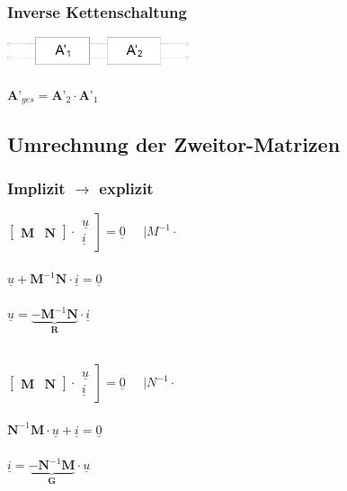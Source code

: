 \documentclass[a4paper,twocolumn,10pt]{article}
\begin{document}
\subsubsection*{Inverse Kettenschaltung}
\includegraphics[width=0.4\textwidth]{Grafiken/Zweitor_inversKette}\\\\
$\textbf{A'}_{ges}=\textbf{A'}_2\cdot \textbf{A'}_1$

\subsection*{Umrechnung der Zweitor-Matrizen}
\subsubsection*{Implizit $\rightarrow$ explizit}
\begin{minipage}[b]{0.23\textwidth}
$\begin{bmatrix}\textbf{M} & \textbf{N}\end{bmatrix}\cdot \left.\begin{matrix}\underline{u}\\\underline{i}\end{matrix}\right]=\underline{0}\;\;\;\;\;|M^{-1}\cdot$\\\\
$\underline{u}+\textbf{M}^{-1}\textbf{N}\cdot \underline{i}=\underline{0}$\\\\
$\underline{u}=\underbrace{-\textbf{M}^{-1}\textbf{N}}_{\textbf{R}}\cdot \underline{i}$\\\\
\end{minipage}
\hfill
\begin{minipage}[b]{0.23\textwidth}
$\begin{bmatrix}\textbf{M} & \textbf{N}\end{bmatrix}\cdot \left.\begin{matrix}\underline{u}\\\underline{i}\end{matrix}\right]=\underline{0}\;\;\;\;\;|N^{-1}\cdot$\\\\
$\textbf{N}^{-1}\textbf{M}\cdot\underline{u}+ \underline{i}=\underline{0}$\\\\
$\underline{i}=\underbrace{-\textbf{N}^{-1}\textbf{M}}_{\textbf{G}}\cdot \underline{u}$\\\\
\end{minipage}
\end{document}
